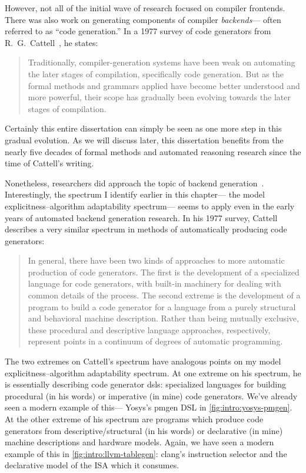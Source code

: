 However, not all of the initial wave of research
  focused on compiler frontends.
There was also work on generating components
  of compiler \textit{backends}---%
  often referred to as 
  ``code generation.''
In a 1977 survey of code generators 
  from R.~G.~Cattell~\cite{cattell1977survey},
  he states:
  \begin{quote}
Traditionally, compiler-generation systems have
been weak on automating the later stages of compilation, specifically code generation.
But as the formal methods and grammars applied have become better understood and
more powerful, their scope has gradually been evolving towards the later stages of
compilation.
  \end{quote}
Certainly this entire dissertation
  can simply be seen as one more step
  in this gradual evolution.
As we will discuss later,
  this dissertation benefits from
  the nearly five decades
  of formal methods and automated reasoning research
  since the time of Cattell's writing.

Nonetheless,
  researchers did approach the topic
  of backend generation~\cite{
  snyder1975portable,
  fraser1988automatic}.
Interestingly,
  the spectrum I identify
  earlier in this chapter---%
  the model explicitness--algorithm adaptability spectrum---%
  seems to apply even in the early years
  of automated backend generation research.
In his 1977 survey, Cattell
  describes a very similar spectrum
  in methods of 
  automatically producing code generators:
\begin{quote}
In general, there have been two kinds of approaches to more automatic production of
code generators. The first is the development of a specialized language for code
generators, with built-in machinery for dealing with common details of the process.
The second extreme is the development of a program to build a code generator for a
language from a purely structural and behavioral machine description. Rather than
being mutually exclusive, these procedural and descriptive language approaches,
respectively, represent points in a continuum of degrees of automatic programming.
\end{quote}
The two extremes on Cattell's spectrum
  have analogous points on my
  model explicitness--algorithm adaptability spectrum.
At one extreme
  on his spectrum,
  he is essentially describing
  code generator \glspl{dsl}:
  specialized languages for
  building procedural (in his words)
  or imperative (in mine)
  code generators.
We've already seen a
  modern example of this---%
  Yosys's pmgen DSL
  in \cref{fig:intro:yosys-pmgen}.
At the other extreme of his spectrum
  are programs which produce code generators from
  descriptive/structural (in his words)
  or declarative (in mine)
  machine descriptions and hardware models.
Again, we have seen a modern example of this
  in \cref{fig:intro:llvm-tablegen}: 
  clang's instruction selector
  and the declarative model of the ISA
  which it consumes.
  


